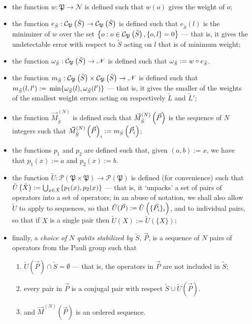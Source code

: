 \documentclass[twocolumn,showpacs,preprintnumbers,amsmath,amssymb,nofootinbib,pra,floatfix]{revtex4-1}
\newenvironment{definition}[1][Definition]{\begin{trivlist}
\item[\hskip \labelsep {\bfseries #1}]}{\end{trivlist}}
\newcommand{\lst}{\vec}
\newcommand{\set}{\tilde}
\newcommand{\pauligroup}{\mathfrak{P}}
\newcommand{\powerset}{\mathcal{P}}
\newcommand{\centralizer}{\mathcal{C}}
\begin{document}
\begin{definition}

\begin{itemize}
\item the function $w:\pauligroup\to \mathscr{N}$ is defined such that $w(o)$ gives the weight of $o$;
\item the function $e_{\set S}:\centralizer_\pauligroup\paren{\set S}\to \centralizer_\pauligroup\paren{\set S}$ is defined such that $e_{\set S}(l)$ is the minimizer of $w$ over the set $\left\{o: o\in \centralizer_\pauligroup\paren{\set S}, \{o,l\}=0\right\}$ --- that is, it gives the undetectable error with respect to $\set S$ acting on $l$ that is of minimum weight;
\item the function $\om_{\set S}:\centralizer_\pauligroup\paren{\set S}\to\mathscr{N}$ is defined such that $\om_{\set S}:=w\circ e_{\set S}$.
\item the function $m_{\set S}:\centralizer_\pauligroup\paren{\set S}\times \centralizer_\pauligroup\paren{\set S} \to \mathscr{N}$ is defined such that $m_{\set S}(l,l'):=\min \{\om_{\set S}(l),\om_{\set S}(l')\}$ --- that is, it gives the smaller of the weights of the smallest weight errors acting on respectively $\set L$ and $\set L'$;
\item the function $\vec M^{(N)}_{\set S}$ is defined such that $\vec M^{(N)}_{\set S}\paren{\vec P}$ is the sequence of $N$ integers such that $\vec M^{(N)}_{\set S}\paren{\vec P}_i := m_{\set S}\paren{\vec P_i}$;
\item the functions $p_1$ and $p_2$ are defined such that, given $(a,b):=x$, we have that $p_1(x):=a$ and $p_2(x):=b$.
\item the function $\set U:\powerset(\pauligroup\times\pauligroup)\to\powerset(\pauligroup)$ is defined (for convenience) such that $\set U\paren{\set X}:=\bigcup_{x\in\set X} \{p_1(x),p_2(x)\}$ --- that is, it `unpacks' a set of pairs of operators into a set of operators;  in an abuse of notation, we shall also allow $\set U$ to apply to sequences, so that $\set U(\lst P) := \set U\paren{\{\lst P_i\}_i}$, and to individual pairs, so that if $X$ is a single pair then $\set U(X) := \set U(\{X\})$;
\item finally, a \emph{choice of $N$ qubits stabilized by $\set S$}, $\lst P$, is a sequence of $N$ pairs of operators from the Pauli group such that 
\begin{enumerate}
\item $\set U(\lst P)\cap \set S = \emptyset$ --- that is, the operators in $\lst P$ are not included in $\set S$;
\item every pair in $\lst P$ is a conjugal pair with respect $\set S \cup \set U(\lst P)$.
\item and $\lst M^{(N)}(\lst P)$ is an ordered sequence.
\end{enumerate}
\end{itemize}

\end{definition}
\end{document}
